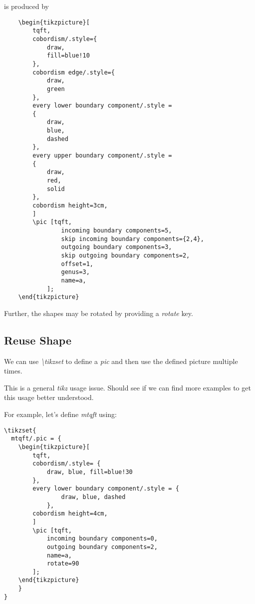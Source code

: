 \documentclass[11pt,twoside]{scrartcl}
\begin{document}
is produced by
\begin{lstlisting}
    \begin{tikzpicture}[
        tqft,
        cobordism/.style={
            draw,
            fill=blue!10
        },
        cobordism edge/.style={
            draw,
            green
        },
        every lower boundary component/.style =
        {
            draw, 
            blue, 
            dashed 
        },
        every upper boundary component/.style =
        {
            draw, 
            red, 
            solid 
        },
        cobordism height=3cm,
        ]
        \pic [tqft,
                incoming boundary components=5,
                skip incoming boundary components={2,4},
                outgoing boundary components=3,
                skip outgoing boundary components=2,
                offset=1,
                genus=3,
                name=a, 
            ];
    \end{tikzpicture}
\end{lstlisting}

Further, the shapes may be rotated by providing a \emph{rotate} key.
\subsection{Reuse Shape}
We can use \emph{\textbackslash{}tikzset} to define a \emph{pic} and then use the defined picture multiple times.
\begin{remark}
    This is a general \emph{tikz} usage issue. Should see if we can find more examples to get this usage better understood.
\end{remark}
For example, let's define \emph{mtqft} using:

\begin{lstlisting}
\tikzset{
  mtqft/.pic = {
    \begin{tikzpicture}[
        tqft,
        cobordism/.style= {
            draw, blue, fill=blue!30
        },
        every lower boundary component/.style = {
                draw, blue, dashed 
            }, 
        cobordism height=4cm,
        ]
        \pic [tqft, 
            incoming boundary components=0,
            outgoing boundary components=2,
            name=a, 
            rotate=90
        ];
    \end{tikzpicture}
    }
}
\end{lstlisting}
\end{document}
